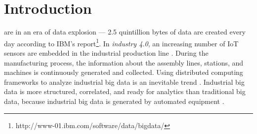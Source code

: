 \section{Introduction}\label{sec:introduction}
 are in an era of data explosion --- 2.5 quintillion bytes of data are created every day according to IBM's report\footnote{http://www-01.ibm.com/software/data/bigdata/}.
{\color{black}
In \textit{industry 4.0}, an increasing number of IoT sensors are embedded in the industrial production line \cite{lade2017manufacturing}.
During the manufacturing process, the information about the assembly lines, stations, and machines is continuously generated and collected.
Using distributed computing frameworks to analyze industrial big data is an inevitable trend \cite{lee2014service}.
Industrial big data is more structured, correlated, and ready for analytics than traditional big data, because industrial big data is generated by automated equipment \cite{basanta2018efficient, lv2017next}.
}

